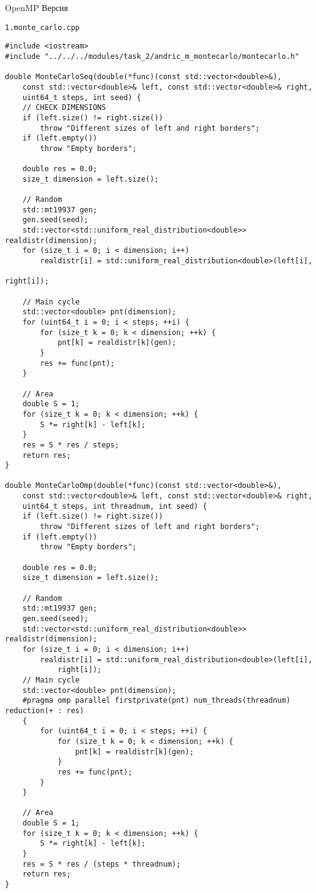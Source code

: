\documentclass{report}
\begin{document}
\par OpenMP Версия
\par \verb|1.monte_carlo.cpp|
\begin{lstlisting}
#include <iostream>
#include "../../../modules/task_2/andric_m_montecarlo/montecarlo.h"

double MonteCarloSeq(double(*func)(const std::vector<double>&),
    const std::vector<double>& left, const std::vector<double>& right,
    uint64_t steps, int seed) {
    // CHECK DIMENSIONS
    if (left.size() != right.size())
        throw "Different sizes of left and right borders";
    if (left.empty())
        throw "Empty borders";

    double res = 0.0;
    size_t dimension = left.size();

    // Random
    std::mt19937 gen;
    gen.seed(seed);
    std::vector<std::uniform_real_distribution<double>> realdistr(dimension);
    for (size_t i = 0; i < dimension; i++)
        realdistr[i] = std::uniform_real_distribution<double>(left[i],
                                                              right[i]);

    // Main cycle
    std::vector<double> pnt(dimension);
    for (uint64_t i = 0; i < steps; ++i) {
        for (size_t k = 0; k < dimension; ++k) {
            pnt[k] = realdistr[k](gen);
        }
        res += func(pnt);
    }

    // Area
    double S = 1;
    for (size_t k = 0; k < dimension; ++k) {
        S *= right[k] - left[k];
    }
    res = S * res / steps;
    return res;
}

double MonteCarloOmp(double(*func)(const std::vector<double>&),
    const std::vector<double>& left, const std::vector<double>& right,
    uint64_t steps, int threadnum, int seed) {
    if (left.size() != right.size())
        throw "Different sizes of left and right borders";
    if (left.empty())
        throw "Empty borders";

    double res = 0.0;
    size_t dimension = left.size();

    // Random
    std::mt19937 gen;
    gen.seed(seed);
    std::vector<std::uniform_real_distribution<double>> realdistr(dimension);
    for (size_t i = 0; i < dimension; i++)
        realdistr[i] = std::uniform_real_distribution<double>(left[i],
            right[i]);
    // Main cycle
    std::vector<double> pnt(dimension);
    #pragma omp parallel firstprivate(pnt) num_threads(threadnum) reduction(+ : res)
    {
        for (uint64_t i = 0; i < steps; ++i) {
            for (size_t k = 0; k < dimension; ++k) {
                pnt[k] = realdistr[k](gen);
            }
            res += func(pnt);
        }
    }

    // Area
    double S = 1;
    for (size_t k = 0; k < dimension; ++k) {
        S *= right[k] - left[k];
    }
    res = S * res / (steps * threadnum);
    return res;
}

\end{lstlisting}
\end{document}
